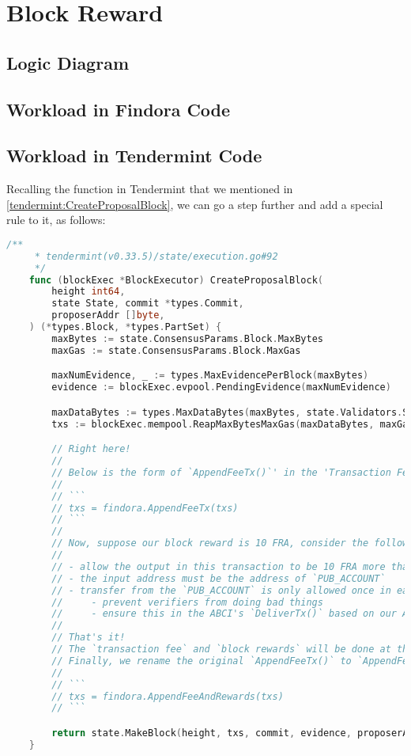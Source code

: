 \section{Block Reward}

\subsection{Logic Diagram}

\subsection{Workload in Findora Code}

\subsection{Workload in Tendermint Code}

Recalling the  function in Tendermint that we mentioned in \ref{tendermint:CreateProposalBlock},
we can go a step further and add a special rule to it, as follows:

\begin{lstlisting}[language=go]
    /**
     * tendermint(v0.33.5)/state/execution.go#92
     */
    func (blockExec *BlockExecutor) CreateProposalBlock(
        height int64,
        state State, commit *types.Commit,
        proposerAddr []byte,
    ) (*types.Block, *types.PartSet) {
        maxBytes := state.ConsensusParams.Block.MaxBytes
        maxGas := state.ConsensusParams.Block.MaxGas

        maxNumEvidence, _ := types.MaxEvidencePerBlock(maxBytes)
        evidence := blockExec.evpool.PendingEvidence(maxNumEvidence)

        maxDataBytes := types.MaxDataBytes(maxBytes, state.Validators.Size(), len(evidence))
        txs := blockExec.mempool.ReapMaxBytesMaxGas(maxDataBytes, maxGas)

        // Right here!
        //
        // Below is the form of `AppendFeeTx()`' in the 'Transaction Fee' section:
        //
        // ```
        // txs = findora.AppendFeeTx(txs)
        // ```
        //
        // Now, suppose our block reward is 10 FRA, consider the following rules:
        //
        // - allow the output in this transaction to be 10 FRA more than the input
        // - the input address must be the address of `PUB_ACCOUNT`
        // - transfer from the `PUB_ACCOUNT` is only allowed once in each block
        //     - prevent verifiers from doing bad things
        //     - ensure this in the ABCI's `DeliverTx()` based on our APP logic
        //
        // That's it!
        // The `transaction fee` and `block rewards` will be done at the same time.
        // Finally, we rename the original `AppendFeeTx()` to `AppendFeeAndRewards()`:
        //
        // ```
        // txs = findora.AppendFeeAndRewards(txs)
        // ```

        return state.MakeBlock(height, txs, commit, evidence, proposerAddr)
    }
\end{lstlisting}
